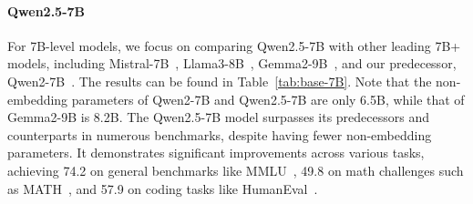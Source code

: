 \paragraph{Qwen2.5-7B}
For 7B-level models, we focus on comparing Qwen2.5-7B with other leading 7B+ models, including Mistral-7B~\citep{mistral}, Llama3-8B~\citep{llama3}, Gemma2-9B~\citep{gemma2}, and our predecessor, Qwen2-7B~\citep{qwen2}.
The results can be found in Table~\ref{tab:base-7B}. Note that the non-embedding parameters of Qwen2-7B and Qwen2.5-7B are only 6.5B, while that of Gemma2-9B is 8.2B.
The Qwen2.5-7B model surpasses its predecessors and counterparts in numerous benchmarks, despite having fewer non-embedding parameters. It demonstrates significant improvements across various tasks, achieving 74.2 on general benchmarks like MMLU~\citep{mmlu}, 49.8 on math challenges such as MATH~\citep{math}, and 57.9 on coding tasks like HumanEval~\citep{humaneval}.

